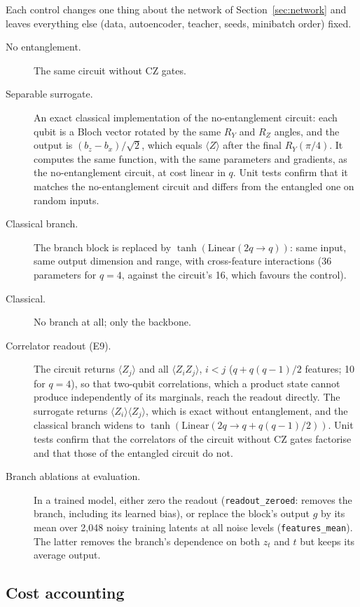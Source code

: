 \documentclass[11pt]{article}
\begin{document}
Each control changes one thing about the network of Section~\ref{sec:network}
and leaves everything else (data, autoencoder, teacher, seeds, minibatch order)
fixed.
\begin{description}
  \item[No entanglement.] The same circuit without CZ gates.
  \item[Separable surrogate.] An exact classical implementation of the
  no-entanglement circuit: each qubit is a Bloch vector rotated by the same
  $R_Y$ and $R_Z$ angles, and the output is $(b_z-b_x)/\sqrt2$, which equals
  $\langle Z\rangle$ after the final $R_Y(\pi/4)$. It computes the same function,
  with the same parameters and gradients, as the no-entanglement circuit, at cost
  linear in $q$. Unit tests confirm that it matches the no-entanglement circuit
  and differs from the entangled one on random inputs.
  \item[Classical branch.] The branch block is replaced by
  $\tanh(\mathrm{Linear}(2q\to q))$: same input, same output dimension and range,
  with cross-feature interactions (36 parameters for $q=4$, against the
  circuit's 16, which favours the control).
  \item[Classical.] No branch at all; only the backbone.
  \item[Correlator readout (E9).] The circuit returns $\langle Z_j\rangle$ and all
  $\langle Z_iZ_j\rangle$, $i<j$ ($q+q(q-1)/2$ features; 10 for $q=4$), so that
  two-qubit correlations, which a product state cannot produce independently of
  its marginals, reach the readout directly. The surrogate returns
  $\langle Z_i\rangle\langle Z_j\rangle$, which is exact without entanglement,
  and the classical branch widens to $\tanh(\mathrm{Linear}(2q\to q+q(q-1)/2))$.
  Unit tests confirm that the correlators of the circuit without CZ gates factorise
  and that those of the entangled circuit do not.
  \item[Branch ablations at evaluation.] In a trained model, either zero the
  readout (\texttt{readout\_zeroed}: removes the branch, including its learned
  bias), or replace the block's output $g$ by its mean over 2{,}048 noisy training
  latents at all noise levels (\texttt{features\_mean}). The latter removes the
  branch's dependence on both $z_t$ and $t$ but keeps its average output.
\end{description}

\subsection{Cost accounting}
\end{document}
